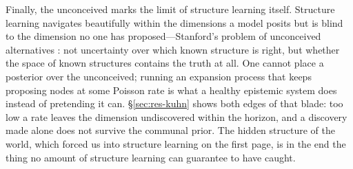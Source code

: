\documentclass[11pt]{article}
\begin{document}
Finally, the unconceived marks the limit of structure learning itself. Structure learning navigates
beautifully within the dimensions a model posits but is blind to the dimension no one has
proposed---Stanford's problem of unconceived alternatives \citep{stanford2006}: not uncertainty over
which known structure is right, but whether the space of known structures contains the truth at all.
One cannot place a posterior over the unconceived; running an expansion process that keeps proposing
nodes at some Poisson rate is what a healthy epistemic system does instead of pretending it can.
\S\ref{sec:res-kuhn} shows both edges of that blade: too low a rate leaves the dimension undiscovered
within the horizon, and a discovery made alone does not survive the communal prior. The hidden
structure of the world, which forced us into structure learning on the first page, is in the end the
thing no amount of structure learning can guarantee to have caught.
\end{document}
